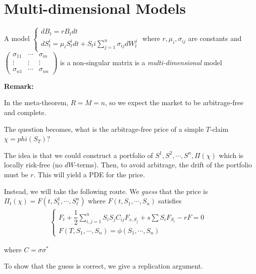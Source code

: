\section{Multi-dimensional Models}
\begin{defo}{}
  A model $\begin{cases}
    dB_t = rB_tdt\\ dS_t^i = \mu_iS_t^idt+S_ti\sum_{j=1}^{n}\sigma_{ij}dW_t^j
    \end{cases}$ where $r,\mu_i,\sigma_{ij}$ are constants and $\begin{pmatrix}\sigma_{11}&\cdots&\sigma_{in}\\\vdots&\vdots&\vdots\\\sigma_{n1}&\cdots&\sigma_{nn}\end{pmatrix}$ is a non-singular matrix is a \textit{multi-dimensional }model
\end{defo}
\par\bigskip
\noindent\textbf{Remark:}\par
\noindent In the meta-theorem, $R=M=n$, so we expect the market to be arbitrage-free and complete.
\par\bigskip
\noindent The question becomes, what is the arbitrage-free price of a simple $T$-claim $\chi = phi(S_T)$?
\par\bigskip
\noindent The idea is that we could construct a portfolio of $S^1,S^2,\cdots,S^n,\Pi(\chi)$ which is locally risk-free (no $dW$-terms). Then, to avoid arbitrage, the drift of the portfolio must be $r$. This will yield a PDE for the price.
\par\bigskip
\noindent Instead, we will take the following route. We \textit{guess} that the price is $\Pi_t(\chi) = F(t,S_t^1,\cdots,S_t^n)$ where $F(t,S_1,\cdots,S_n)$ satisfies
\begin{equation}
  \begin{gathered}
    \begin{cases}
      F_t+\dfrac{1}{2}\sum_{i,j=1}^{n}S_iS_jC_{ij}F_{s,S_j}+s\sum S_iF_{S_i}-rF=0\\
      F(T,S_1,\cdots,S_n) = \phi(S_1,\cdots,S_n)
    \end{cases}
  \end{gathered}
\end{equation}\par
\noindent where $C=\sigma\sigma^*$\par
\noindent To show that the guess is correct, we give a replication argument.
\par\bigskip

